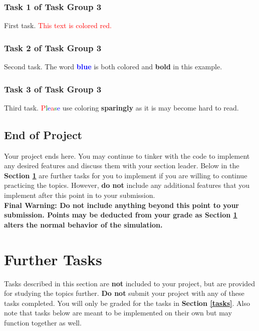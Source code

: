 \documentclass[a4paper]{article}
\begin{document}
\subsubsection{Task 1 of Task Group 3}
First task. \textcolor{Red}{This text is colored red.}

\subsubsection{Task 2 of Task Group 3}
Second task. The word \textbf{\textcolor{Blue}{blue}} is both colored and \textbf{bold} in this example.

\subsubsection{Task 3 of Task Group 3}
Third task. \textcolor{Red}{P}\textcolor{Green}{l}\textcolor{Blue}{e}\textcolor{Red}{a}\textcolor{Green}{s}\textcolor{Blue}{e} use coloring \textbf{sparingly} as it is may become hard to read.

\subsection{End of Project}
Your project ends here. You may continue to tinker with the code to implement any desired features and discuss them with your section leader. Below in the \textbf{Section \ref{further}} are further tasks for you to implement if you are willing to continue practicing the topics. However, \textbf{do not} include any additional features that you implement after this point in to your submission.  
\\

\noindent \textbf{Final Warning: Do not include anything beyond this point to your submission. Points may be deducted from your grade as Section \ref{further} alters the normal behavior of the simulation.} 

\section{Further Tasks}
\label{further}
Tasks described in this section are \textbf{not} included to your project, but are provided for studying the topics further. \textbf{Do not} submit your project with any of these tasks completed. You will only be graded for the tasks in \textbf{Section \ref{tasks}}. Also note that tasks below are meant to be implemented on their own but may function together as well.
\end{document}
